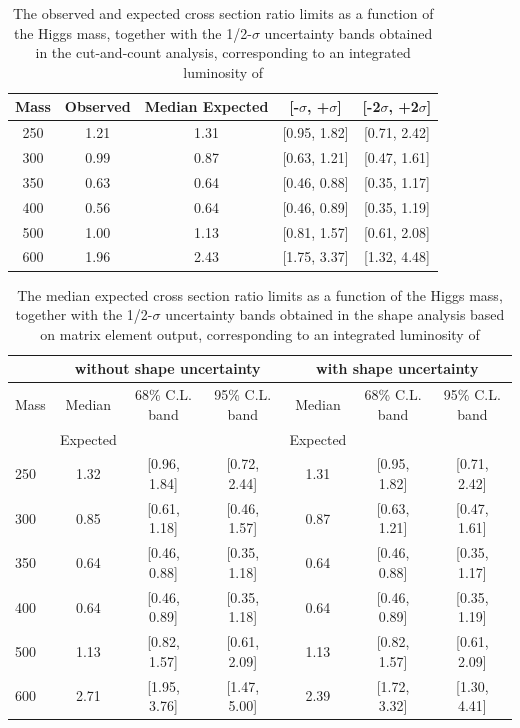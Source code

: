 \begin{table}[!ht]
\begin{center}
\begin{tabular}{ccccc}
\hline\hline
Mass & Observed & Median Expected & [-$\sigma$, +$\sigma$] & [-2$\sigma$, +2$\sigma$]\\\hline
250 & 1.21 & 1.31 & [0.95, 1.82] & [0.71, 2.42] \\
300 & 0.99 & 0.87 & [0.63, 1.21] & [0.47, 1.61] \\
350 & 0.63 & 0.64 & [0.46, 0.88] & [0.35, 1.17] \\
400 & 0.56 & 0.64 & [0.46, 0.89] & [0.35, 1.19] \\
500 & 1.00 & 1.13 & [0.81, 1.57] & [0.61, 2.08] \\
600 & 1.96 & 2.43 & [1.75, 3.37] & [1.32, 4.48] \\
\hline\hline
\end{tabular}
\end{center}
\caption{The observed and expected cross section ratio limits as a function 
of the Higgs mass, together with the 1/2-$\sigma$ uncertainty bands obtained in the cut-and-count analysis, corresponding to 
an integrated luminosity of \intlumi}
\label{tab:limits_meshape_5fb}
\end{table}


\begin{table}
\begin{center}
{\normalsize
\begin{tabular}{|l|c|c|c|c|c|c|}
\hline
      &  \multicolumn{3}{c|}{ without shape uncertainty} &\multicolumn{3}{c|}{ with shape uncertainty} \\
\hline
Mass  &  Median      &     68\% C.L. band &  95\% C.L. band &  Median	   &	 68\% C.L. band &  95\% C.L. band\\
      &  Expected    &                    &                 &  Expected    &			&		 \\
\hline
250 & 1.32 & [0.96, 1.84] & [0.72, 2.44] & 1.31 & [0.95, 1.82] & [0.71, 2.42] \\
300 & 0.85 & [0.61, 1.18] & [0.46, 1.57] & 0.87 & [0.63, 1.21] & [0.47, 1.61] \\
350 & 0.64 & [0.46, 0.88] & [0.35, 1.18] & 0.64 & [0.46, 0.88] & [0.35, 1.17] \\
400 & 0.64 & [0.46, 0.89] & [0.35, 1.18] & 0.64 & [0.46, 0.89] & [0.35, 1.19] \\
500 & 1.13 & [0.82, 1.57] & [0.61, 2.09] & 1.13 & [0.82, 1.57] & [0.61, 2.09] \\
600 & 2.71 & [1.95, 3.76] & [1.47, 5.00] & 2.39 & [1.72, 3.32] & [1.30, 4.41] \\
\hline
\end{tabular}
}
\end{center}
\caption{The median expected cross section ratio limits as a function 
of the Higgs mass, together with the 1/2-$\sigma$ uncertainty bands obtained in the shape analysis based on matrix element output, 
corresponding to an integrated luminosity of \intlumi}
\label{tab:limits_meshape_uncert_5fb}
\end{table}


